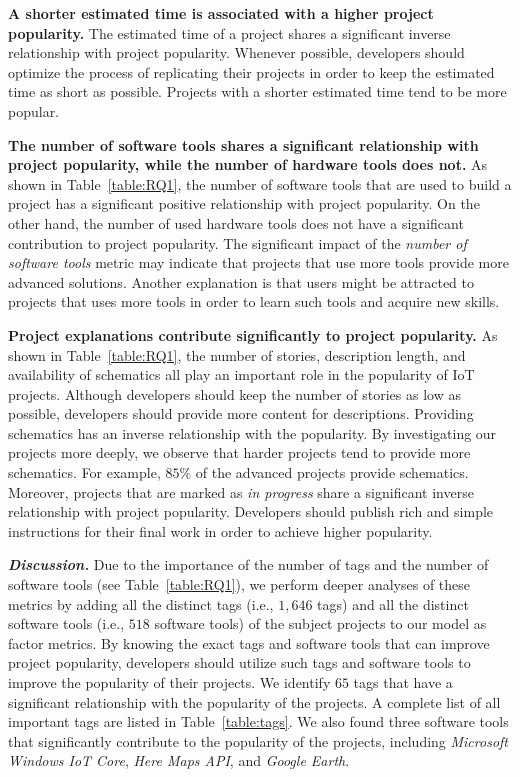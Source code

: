 \textbf{A shorter estimated time is associated with a higher project
popularity.} The estimated time of a project shares a significant inverse
relationship with project popularity. Whenever possible, developers should
optimize the process of replicating their projects in order to keep the
estimated time as short as possible. Projects with a shorter estimated time
tend to be more popular.

\textbf{The number of software tools shares a significant relationship with
project popularity, while the number of hardware tools does not.} As shown in
Table~\ref{table:RQ1}, the number of software tools that are used to build a
project has a significant positive relationship with project popularity. On the
other hand, the number of used hardware tools does not have a significant
contribution to project popularity. The significant impact of the {\em number
of software tools} metric may indicate that projects that use more tools
provide more advanced solutions. Another explanation is that users might be
attracted to projects that uses more tools in order to learn such tools and
acquire new skills.

\textbf{Project explanations contribute significantly to project popularity.}
As shown in Table~\ref{table:RQ1}, the number of stories, description length,
and availability of schematics all play an important role in the popularity of
IoT projects.  Although developers should keep the number of stories as low as
possible, developers should provide more content for descriptions.  Providing
schematics has an inverse relationship with the popularity. By investigating
our projects more deeply, we observe that harder projects tend to provide more
schematics.  For example, $85\%$ of the advanced projects provide schematics.
Moreover, projects that are marked as \textit{in progress} share a significant
inverse relationship with project popularity.  Developers should publish rich
and simple instructions for their final work in order to achieve higher
popularity.




\noindent\textbf{\textit{Discussion.}}
Due to the importance of the number of tags and the number of software tools
(see Table~\ref{table:RQ1}), we perform deeper analyses of these metrics by
adding all the distinct tags (i.e., $1,646$ tags) and all the distinct software
tools (i.e., $518$ software tools) of the subject projects to our model as
factor metrics.
By knowing the exact tags and software tools that can improve project popularity, developers should utilize such tags and software tools to improve the popularity of their projects.
We identify $65$ tags that have a significant relationship with the popularity
of the projects. A complete list of all important tags are listed in
Table~\ref{table:tags}. We also found three software tools that significantly
contribute to the popularity of the projects, including \emph{Microsoft Windows
IoT Core}, \emph{Here Maps API}, and \emph{Google Earth}.


